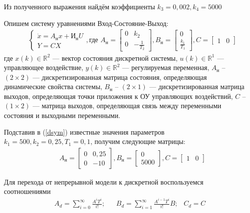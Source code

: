 \documentclass[fleqn, a4paper, 11pt, russian]{article}
\newcommand{\R}{\mathbb{R}}
\begin{document}
	Из полученного выражения найдём коэффициенты $k_3 = 0,002, k_4 = 5000$	
	
	Опишем систему уравнениями Вход-Состояние-Выход:
	\begin{align} \label{dsym}
		&&\begin{cases}
			\dot{x} = A_\text{н}x + И_\text{н}U\\
			Y = CX
		\end{cases} , \text{где } A_\text{н} = \begin{bmatrix}
			0 & k_2\\
			0 & -\displaystyle{\frac{1}{T_2}}
		\end{bmatrix}, B_\text{н} = \begin{bmatrix}
			0\\
			\displaystyle{\frac{k_1}{T_1}}
		\end{bmatrix}, C = \begin{bmatrix}
			1 & 0
		\end{bmatrix}
	\end{align}
	где $x(k)\in\R^2$ --- вектор состояния дискретной системы, $u(k)\in\R^1$ --- управляющее воздействие, $y(k)\in\R^2$ --- регулируемая переменная, $A_\text{н}$ -- $(2\times 2)$ --- дискретизированная матрица состояния, определяющая динамические свойства системы, $B_\text{н}$ -- $(2 \times 1)$ --- дискретизированная матрица выходов, определяющая точки приложения к ОУ управляющих воздействий, $C$ -- $(1 \times 2)$ --- матрица выходов, определяющая связь между переменными состояния и выходными переменными.
	
	Подставив в (\ref{dsym}) известные значения параметров $k_1 = 500, k_2 = 0,25, T_1 = 0,1$, получим следующие матрицы:
	\begin{align}
		&&A_\text{н} = \begin{bmatrix}
			0 & 0,25\\
			0 & -10
		\end{bmatrix}, B_\text{н} = \begin{bmatrix}
			0\\
			5000
		\end{bmatrix}, C = \begin{bmatrix}
			1 & 0
		\end{bmatrix}
	\end{align}
	
	Для перехода от непрерывной модели к дискретной воспользуемся соотношениями
	\begin{align} \label{c2d}
		&A_d = \sum_{i = 0}^{\infty}\displaystyle{\frac{A^iT^i}{i!}}; &&B_d = \sum_{i = 1}^{\infty} \displaystyle{\frac{A^{i-1}T^i}{i!}}B; &C_d = C
	\end{align}
	
\end{document}
